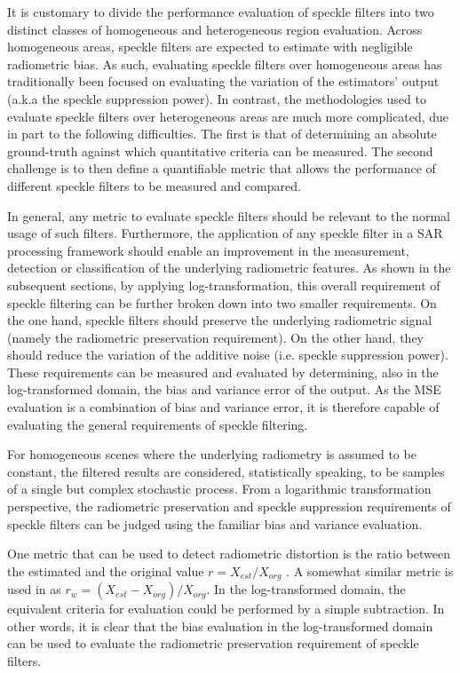 It is customary to divide the performance evaluation of speckle filters into two distinct classes of 
	homogeneous and heterogeneous region evaluation.
Across homogeneous areas, speckle filters are expected to estimate with negligible radiometric bias.
As such, evaluating speckle filters over homogeneous areas has traditionally been focused on evaluating the variation of the estimators'
	output (a.k.a the speckle suppression power).
In contrast, the methodologies used to evaluate speckle filters over heterogeneous areas are much more complicated, 
	due in part to the following difficulties.
The first is that of determining an absolute ground-truth against which quantitative criteria can be measured.
The second challenge is to then define a quantifiable metric that allows the performance of different speckle filters 
	to be measured and compared.

In general, any metric to evaluate speckle filters should be relevant to the normal usage of such filters.
Furthermore, the application of any speckle filter in a SAR processing framework
   should enable an improvement in the measurement, 
	detection or classification of the underlying radiometric features.
As shown in the subsequent sections, by applying log-transformation, 
	this overall requirement of speckle filtering can be further broken down into two smaller requirements.
On the one hand, speckle filters should preserve the underlying radiometric signal (namely the radiometric 
	preservation requirement).
On the other hand, they should reduce the variation of the additive noise (i.e. speckle suppression power).
These requirements can be measured and evaluated by determining, also in the log-transformed domain, the bias 
	and variance error of the output.
As the MSE evaluation is a combination of bias and variance error, it is therefore capable of evaluating 
	the general requirements of speckle filtering.

For homogeneous scenes where the underlying radiometry is assumed to be constant, 
	the filtered results are considered, statistically speaking, to be samples of 
	a single but complex stochastic process.
From a logarithmic transformation perspective, the radiometric preservation and speckle suppression requirements 
	of speckle filters can be judged using the familiar bias and variance evaluation.

One metric that can be used to detect radiometric distortion is the ratio between the estimated and the 
	original value $r = X_{est} / X_{org}$ \cite{Oliver_2004_SciTech} \cite{Medeiros_2003_IJRS}.
A somewhat similar metric is used in \cite{Wang_2005_MIPR} as $r_w = (X_{est} - X_{org} )/ X_{org}$.
In the log-transformed domain, the equivalent criteria for evaluation could be performed by a simple subtraction.
In other words, it is clear that the bias evaluation in the log-transformed domain 
	can be used to evaluate the radiometric preservation requirement of speckle filters. 

